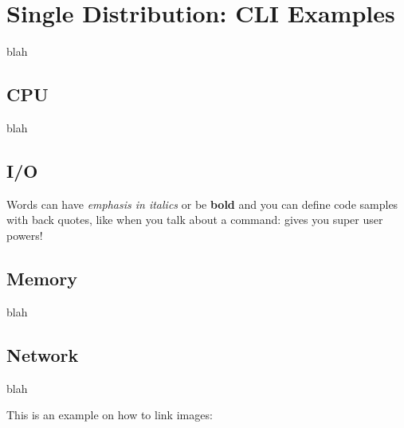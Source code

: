 \documentclass[letterpaper,10pt,english]{sphinxmanual}
\begin{document}
\section{Single Distribution: CLI Examples}
\label{02_cli_examples:single-distribution-cli-examples}\label{02_cli_examples::doc}
blah


\subsection{CPU}
\label{02_cli_examples:cpu}
blah


\subsection{I/O}
\label{02_cli_examples:i-o}
Words can have \emph{emphasis in italics} or be \textbf{bold} and you can
define code samples with back quotes, like when you talk about a
command:  gives you super user powers!


\subsection{Memory}
\label{02_cli_examples:memory}
blah


\subsection{Network}
\label{02_cli_examples:network}
blah

This is an example on how to link images:
\end{document}
